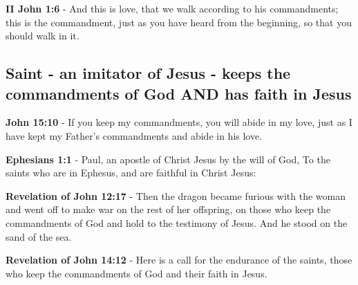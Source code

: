 \documentclass[11pt]{article}
\begin{document}
\textbf{II John 1:6} - And this is love, that we walk according to his commandments; this is the commandment, just as you have heard from the beginning, so that you should walk in it.

\subsection{Saint - an imitator of Jesus - keeps the commandments of God AND has faith in Jesus}
\label{sec:org9af107d}
\textbf{John 15:10} - If you keep my commandments, you will abide in my love, just as I have kept my Father's commandments and abide in his love.

\textbf{Ephesians 1:1} - Paul, an apostle of Christ Jesus by the will of God, To the saints who are in Ephesus, and are faithful in Christ Jesus:

\textbf{Revelation of John 12:17} - Then the dragon became furious with the woman and went off to make war on the rest of her offspring, on those who keep the commandments of God and hold to the testimony of Jesus. And he stood on the sand of the sea.

\textbf{Revelation of John 14:12} - Here is a call for the endurance of the saints, those who keep the commandments of God and their faith in Jesus.
\end{document}
